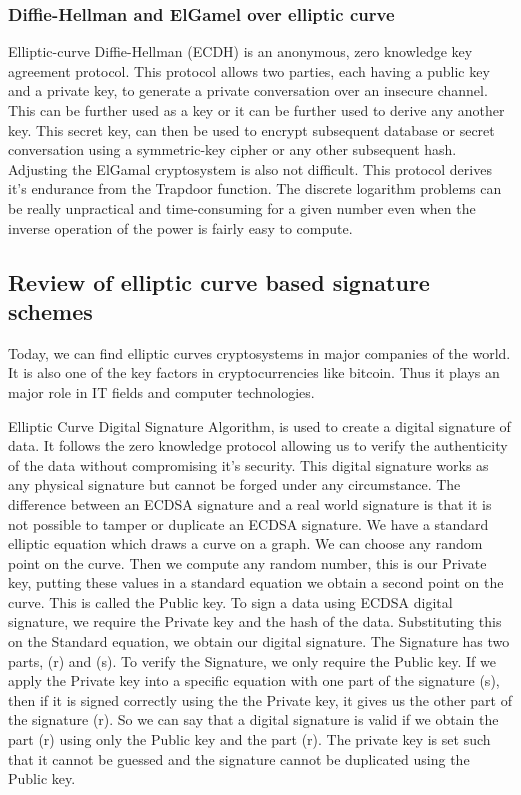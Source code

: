 \documentclass{report}
\begin{document}
\subsubsection{Diffie-Hellman and ElGamel over elliptic curve}
Elliptic-curve Diffie-Hellman (ECDH) is an anonymous, zero knowledge key agreement protocol. This protocol allows two parties, each having a public key and a private key, to generate a private conversation over an insecure channel. This can be further used as a key or it can be further used to derive any another key. This secret key, can then be used to encrypt subsequent database or secret conversation using a symmetric-key cipher or any other subsequent hash.\\ \cite{brown2009standards}
Adjusting the ElGamal cryptosystem is also not difficult. This protocol derives it's endurance from the Trapdoor function. The discrete logarithm problems can be really unpractical and time-consuming for a given number even when the inverse operation of the power is fairly easy to compute.
\subsection{Review of elliptic curve based signature schemes}
Today, we can find elliptic curves cryptosystems\cite{WinNT20} in major companies of the world. It is also one of the key factors in cryptocurrencies like bitcoin. Thus it plays an major role in IT fields and computer technologies. 


Elliptic Curve Digital Signature Algorithm, is used to create a digital signature of data. It follows the zero knowledge protocol allowing us to verify the authenticity of the data without compromising it's security.
 This digital signature works as any physical signature but cannot  be forged under any circumstance. The difference between an ECDSA signature and a real world signature is that it is not possible to tamper or duplicate an ECDSA signature.
 We have a standard elliptic equation which draws a curve on a graph. We can choose any random point on the curve. Then we compute any random number, this is our Private key, putting these values in a standard equation we obtain a second point on the curve. This is called the Public key.
To sign a data using ECDSA digital signature, we require the Private key and the hash of the data. Substituting this on the Standard equation, we obtain our digital signature. 
The Signature has two parts, (r) and (s). To verify the Signature, we only require the Public key. If we apply the Private key into a specific equation with one part of the signature (s), then if it is signed correctly using the the Private key, it gives us the other part of the signature (r). 
So we can say that a digital signature is valid if we obtain the part (r) using only the Public key and the part (r). The private key is set such that it cannot be guessed and the signature cannot be duplicated using the Public key.
\end{document}

